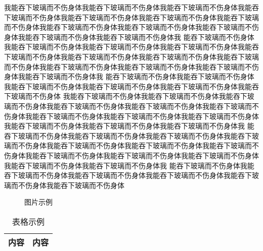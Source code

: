 \documentclass[a4paper,UTF8]{ctexart}
\begin{document}
我能吞下玻璃而不伤身体我能吞下玻璃而不伤身体我能吞下玻璃而不伤身体我能吞下玻璃而不伤身体我能吞下玻璃而不伤身体我能吞下玻璃而不伤身体我能吞下玻璃而不伤身体我能吞下玻璃而不伤身体我能吞下玻璃而不伤身体我能吞下玻璃而不伤身体我能吞下玻璃而不伤身体我能吞下玻璃而不伤身体我
能吞下玻璃而不伤身体我能吞下玻璃而不伤身体我能吞下玻璃而不伤身体我能吞下玻璃而不伤身体我能吞下玻璃而不伤身体我能吞下玻璃而不伤身体我能吞下玻璃而不伤身体我能吞下玻璃而不伤身体我能吞下玻璃而不伤身体我能吞下玻璃而不伤身体我能吞下玻璃而不伤身体我能吞下玻璃而不伤身体我
能吞下玻璃而不伤身体我能吞下玻璃而不伤身体我能吞下玻璃而不伤身体我能吞下玻璃而不伤身体我能吞下玻璃而不伤身体我能吞下玻璃而不伤身体
我能吞下玻璃而不伤身体我能吞下玻璃而不伤身体我能吞下玻璃而不伤身体我能吞下玻璃而不伤身体我能吞下玻璃而不伤身体我能吞下玻璃而不伤身体我能吞下玻璃而不伤身体我能吞下玻璃而不伤身体我能吞下玻璃而不伤身体我能吞下玻璃而不伤身体我能吞下玻璃而不伤身体我能吞下玻璃而不伤身体我
能吞下玻璃而不伤身体我能吞下玻璃而不伤身体我能吞下玻璃而不伤身体我能吞下玻璃而不伤身体我能吞下玻璃而不伤身体我能吞下玻璃而不伤身体我能吞下玻璃而不伤身体我能吞下玻璃而不伤身体我能吞下玻璃而不伤身体我能吞下玻璃而不伤身体我能吞下玻璃而不伤身体我能吞下玻璃而不伤身体我
能吞下玻璃而不伤身体我能吞下玻璃而不伤身体我能吞下玻璃而不伤身体我能吞下玻璃而不伤身体我能吞下玻璃而不伤身体我能吞下玻璃而不伤身体
















\begin{figure}[htbp]
  \centering
  \caption{图片示例}
\end{figure}

\begin{table}[htbp]
  \centering
  \caption{表格示例}
  \begin{tabular}{|c|c|}
    \hline
    内容 & 内容 \\
    \hline
  \end{tabular}
\end{table}









\end{document}
